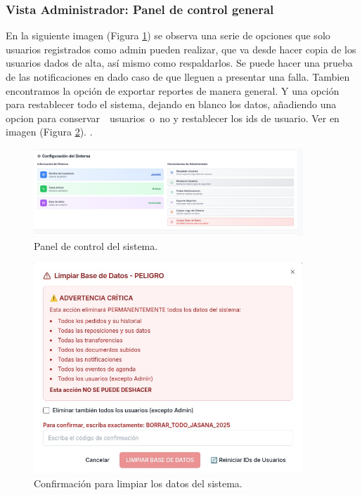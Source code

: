 \documentclass[12pt,letterpaper,spanish]{report}
\begin{document}
\subsubsection{Vista Administrador: Panel de control general}
En la siguiente imagen (Figura \ref{fig:adminpanel}) se observa una serie de opciones que solo usuarios registrados como admin pueden realizar, que va desde hacer copia de los usuarios dados de alta, así mismo como respaldarlos.
Se puede hacer una prueba de las notificaciones en dado caso de que lleguen a presentar una falla.
Tambien encontramos la opción de exportar reportes de manera general.
Y una opción para restablecer todo el sistema, dejando en blanco los datos, añadiendo una opcion para conservar  usuarios o no y restablecer los ids de usuario. Ver en imagen (Figura \ref{fig:borrartodo}).   .

\begin{figure}[H]
    \centering
    \includegraphics[width=0.9\textwidth]{admin_panel.jpg}
    \caption{Panel de control del sistema.}
    \label{fig:adminpanel}
\end{figure}
\begin{figure}[H]
    \centering
    \includegraphics[width=0.9\textwidth]{limpi_bd.jpg}
    \caption{Confirmación para limpiar los datos del sistema.}
    \label{fig:borrartodo}
\end{figure}
\end{document}
